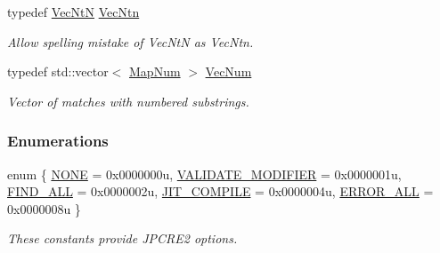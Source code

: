 \begin{DoxyCompactItemize}
typedef \hyperlink{namespacejpcre2_a88a7aaf84cad627d34c8152e726168eb}{Vec\+NtN} \hyperlink{namespacejpcre2_a8d6b7b4c873bc7cb4626f950d2b40f9d}{Vec\+Ntn}
\begin{DoxyCompactList}\small\item\em Allow spelling mistake of Vec\+NtN as Vec\+Ntn. \end{DoxyCompactList}\item 
\hypertarget{namespacejpcre2_ac1cf752c8fbb0be78020be3b80e77ce3}{}\label{namespacejpcre2_ac1cf752c8fbb0be78020be3b80e77ce3} 
typedef std\+::vector$<$ \hyperlink{namespacejpcre2_a947e37f0e4a1678157e7f1f855638e82}{Map\+Num} $>$ \hyperlink{namespacejpcre2_ac1cf752c8fbb0be78020be3b80e77ce3}{Vec\+Num}
\begin{DoxyCompactList}\small\item\em Vector of matches with numbered substrings. \end{DoxyCompactList}\end{DoxyCompactItemize}
\subsubsection*{Enumerations}
\begin{DoxyCompactItemize}
\item 
enum \{ \newline
\hyperlink{namespacejpcre2_a85c143271501e383843f45b9999c2f00_a85c143271501e383843f45b9999c2f00aecf4a781b081ff541006fbe84e143fb9}{N\+O\+NE} = 0x0000000u, 
\newline
\hyperlink{namespacejpcre2_a85c143271501e383843f45b9999c2f00_a85c143271501e383843f45b9999c2f00a9124b768bcae4d51430aa7f26126f387}{V\+A\+L\+I\+D\+A\+T\+E\+\_\+\+M\+O\+D\+I\+F\+I\+ER} = 0x0000001u, 
\newline
\hyperlink{namespacejpcre2_a85c143271501e383843f45b9999c2f00_a85c143271501e383843f45b9999c2f00af29fccdb263520155e9c25a826a7200c}{F\+I\+N\+D\+\_\+\+A\+LL} = 0x0000002u, 
\newline
\hyperlink{namespacejpcre2_a85c143271501e383843f45b9999c2f00_a85c143271501e383843f45b9999c2f00a5e8bab7c478015b19baf3e84ed00876e}{J\+I\+T\+\_\+\+C\+O\+M\+P\+I\+LE} = 0x0000004u, 
\newline
\hyperlink{namespacejpcre2_a85c143271501e383843f45b9999c2f00_a85c143271501e383843f45b9999c2f00a6fec35fc9fdd8a606bed430c1816c552}{E\+R\+R\+O\+R\+\_\+\+A\+LL} = 0x0000008u
 \}\begin{DoxyCompactList}\small\item\em These constants provide J\+P\+C\+R\+E2 options. \end{DoxyCompactList}
\end{DoxyCompactItemize}
